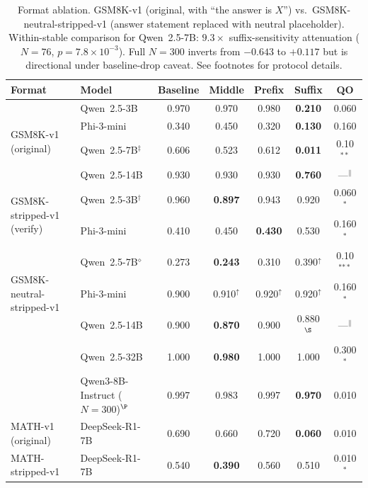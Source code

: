 \documentclass{article}
\theoremstyle{definition}
\theoremstyle{definition}
\newcommand{\QTHREENSBASE}{0.997}
\newcommand{\QTHREENSMID}{0.983}
\newcommand{\QTHREENSPRE}{0.997}
\newcommand{\QTHREENSSUF}{0.970}
\newcommand{\QTHREENSQO}{0.010}
\newcommand{\MATHORIGbase}{0.690}
\newcommand{\MATHORIGprefix}{0.720}
\newcommand{\MATHORIGmiddle}{0.660}
\newcommand{\MATHORIGsuffix}{0.060}
\newcommand{\MATHSTRIPbase}{0.540}
\newcommand{\MATHSTRIPprefix}{0.560}
\newcommand{\MATHSTRIPmiddle}{0.390}
\newcommand{\MATHSTRIPsuffix}{0.510}
\newcommand{\MATHQO}{0.010}
\begin{document}
\begin{table}[t]
  \centering
  \small
  \caption{Format ablation. GSM8K-v1 (original, with ``the answer is $X$'') vs.\ GSM8K-neutral-stripped-v1
  (answer statement replaced with neutral placeholder). Within-stable comparison
  for Qwen~2.5-7B: $9.3\times$ suffix-sensitivity attenuation ($N{=}76$, $p{=}7.8{\times}10^{-3}$).
  Full $N{=}300$ inverts from $-0.643$ to $+0.117$ but is directional under baseline-drop caveat.
  See footnotes for protocol details.}
  \label{tab:ablation}
  \begin{tabular}{llccccc}
    \toprule
    Format & Model & Baseline & Middle & Prefix & Suffix & QO \\
    \midrule
    \multirow{4}{*}{GSM8K-v1 (original)}
      & Qwen~2.5-3B  & 0.970 & 0.970 & 0.980 & \textbf{0.210} & 0.060 \\
      & Phi-3-mini    & 0.340 & 0.450 & 0.320 & \textbf{0.130} & 0.160 \\
      & Qwen~2.5-7B$^\ddagger$   & 0.606 & 0.523 & 0.612 & \textbf{0.011} & 0.10$^{**}$   \\
      & Qwen~2.5-14B  & 0.930 & 0.930 & 0.930 & \textbf{0.760} & ---$^\|$ \\
    \midrule
    \multirow{2}{*}{GSM8K-stripped-v1 (verify)}
      & Qwen~2.5-3B$^\dagger$  & 0.960 & \textbf{0.897} & 0.943 & 0.920 & 0.060$^*$ \\
      & Phi-3-mini    & 0.410 & 0.450 & \textbf{0.430} & 0.530 & 0.160$^*$ \\
    \midrule
    \multirow{3}{*}{GSM8K-neutral-stripped-v1}
      & Qwen~2.5-7B$^\diamond$ & 0.273 & \textbf{0.243} & 0.310 & 0.390$^\uparrow$ & 0.10$^{*{**}}$ \\
      & Phi-3-mini   & 0.900 & 0.910$^\uparrow$ & 0.920$^\uparrow$ & 0.920$^\uparrow$ & 0.160$^*$ \\
      & Qwen~2.5-14B & 0.900 & \textbf{0.870} & 0.900 & 0.880$^\S$ & ---$^\|$ \\
      & Qwen~2.5-32B & 1.000 & \textbf{0.980} & 1.000 & 1.000 & 0.300$^*$ \\
      & Qwen3-8B-Instruct ($N{=}300$)$^\P$ & \QTHREENSBASE & \QTHREENSMID & \QTHREENSPRE & \textbf{\QTHREENSSUF} & \QTHREENSQO \\
    \midrule
    \multirow{1}{*}{MATH-v1 (original)}
      & DeepSeek-R1-7B & \MATHORIGbase & \MATHORIGmiddle & \MATHORIGprefix & \textbf{\MATHORIGsuffix} & \MATHQO \\
    \midrule
    \multirow{1}{*}{MATH-stripped-v1}
      & DeepSeek-R1-7B & \MATHSTRIPbase & \textbf{\MATHSTRIPmiddle} & \MATHSTRIPprefix & \MATHSTRIPsuffix & \MATHQO$^*$ \\
  \end{tabular}


\end{table}
\end{document}

